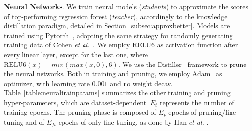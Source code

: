 \smallskip
\noindent \textbf{Neural Networks}. We train neural models (\textit{students}) to approximate the scores of top-performing regression forest (\textit{teacher}), accordingly to the knowledge distillation \cite{ba2014deep} paradigm, detailed in Section~\ref{subsec:approxbetter}. Models are trained using Pytorch~\cite{NEURIPS2019_9015}, adopting the same strategy for randomly generating training data of Cohen \textit{et al}.~\cite{cohen2018universal}. We employ RELU6 as activation function after every linear layer, except for the last one, where $\text{RELU6}(x) = min(max(x,0), 6)$. 
We use the Distiller~\cite{nzmora2019distiller} framework to prune the neural networks. Both in training and pruning, we employ Adam~\cite{kingma2014adam} as optimizer, with learning rate $0.001$ and no weight decay. Table~\ref{table:neuraltrainparams} summarizes the other training and pruning hyper-parameters, which are dataset-dependent. $E_t$ represents the number of training epochs. The pruning phase is composed of $E_p$ epochs of pruning/fine-tuning and of $E_{ft}$ epochs of only fine-tuning, as done by Han \textit{et al.
\cite{DBLP:journals/corr/HanPTD15}}.
